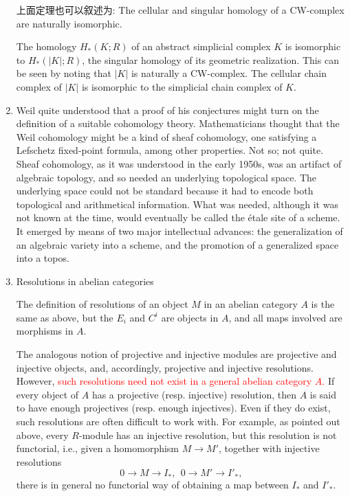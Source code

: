 \documentclass[UTF8]{ctexart}
\begin{document}
\begin{enumerate}
上面定理也可以叙述为: The cellular and singular homology of a CW-complex are naturally isomorphic.

The homology $H_\ast(K;R)$ of an abstract simplicial complex $K$ is isomorphic to $H_\ast(\left|K\right|;R)$, the singular homology of its geometric realization. This can be seen by noting that $\left|K\right|$ is naturally a CW-complex. The cellular chain complex of $\left|K\right|$ is isomorphic to the simplicial chain complex of $K$.

\item \cite{tohoku}Weil quite understood that a proof of his conjectures might turn on the definition of a suitable cohomology theory. Mathematicians thought that the Weil cohomology might be a kind of sheaf cohomology, one satisfying a Lefschetz fixed-point formula, among other properties. Not so; not quite. Sheaf cohomology, as it was understood in the early 1950s, was an artifact of algebraic topology, and so needed an underlying topological space. The underlying space could not be standard because it had to encode both topological and arithmetical information. What was needed, although it was not known at the time, would eventually be called the étale site of a scheme. It emerged by means of two major intellectual advances: the generalization of an algebraic variety into a scheme, and the promotion of a generalized space into a topos.

\item Resolutions in abelian categories\parencite{resolutions_in_abelian_categories}

The definition of resolutions of an object $M$ in an abelian category $A$ is the same as above, but the $E_i$ and $C^i$ are objects in $A$, and all maps involved are morphisms in $A$.

The analogous notion of projective and injective modules are projective and injective objects, and, accordingly, projective and injective resolutions. However, \textcolor{red}{such resolutions need not exist in a general abelian category $A$.} If every object of $A$ has a projective (resp. injective) resolution, then $A$ is said to have enough projectives (resp. enough injectives). Even if they do exist, such resolutions are often difficult to work with. For example, as pointed out above, every $R$-module has an injective resolution, but this resolution is not functorial, i.e., given a homomorphism $M \to M'$, together with injective resolutions
\[
0\rightarrow M\rightarrow I_{*},\ \ 0\rightarrow M'\rightarrow I'_{*},
\]
there is in general no functorial way of obtaining a map between $I_{*}$ and $I'_{*}$.


\end{enumerate}
\end{document}
